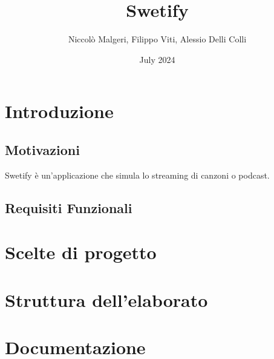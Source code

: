 \documentclass{article}
\title{Swetify}
\author{Niccolò Malgeri, Filippo Viti, Alessio Delli Colli}
\date{July 2024}
\begin{document}
\maketitle

\tableofcontents
\newpage

\section{Introduzione}

\subsection{Motivazioni}
Swetify è un'applicazione che simula lo streaming di canzoni o podcast.
\subsection{Requisiti Funzionali}

\section{Scelte di progetto}
\section{Struttura dell'elaborato}
\section{Documentazione}
\end{document}
